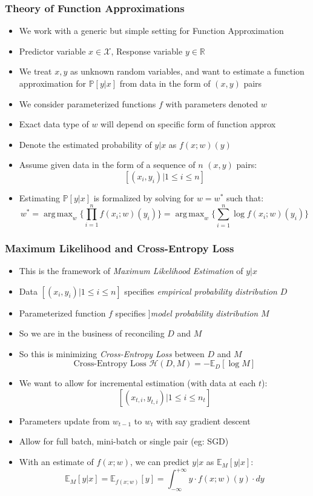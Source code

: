 \documentclass[handout]{beamer}
\DeclareMathOperator*{\argmax}{arg\,max}
\begin{document}
\begin{frame}
\frametitle{Theory of Function Approximations}
\pause
\begin{itemize}[<+->]
\item We work with a generic but simple setting for Function Approximation
\item Predictor variable $x \in \mathcal{X}$, Response variable $y \in \mathbb{R}$
\item We treat $x, y$ as unknown random variables, and want to estimate a function approximation for $\mathbb{P}[y|x]$ from data in the form of $(x,y)$ pairs
\item We consider parameterized functions $f$ with parameters denoted $w$
\item  Exact data type of $w$ will depend on specific form of function approx
\item  Denote the estimated probability of $y|x$ as $f(x; w)(y)$
\item  Assume given data in the form of a sequence of $n$ $(x,y)$ pairs:
$$[(x_i, y_i)|1 \leq i \leq n]$$
\item  Estimating $\mathbb{P}[y|x]$ is formalized by solving for $w=w^*$ such that:
$$w^* = \argmax_w \{ \prod_{i=1}^n f(x_i; w)(y_i)\} = \argmax_w \{ \sum_{i=1}^n \log f(x_i; w)(y_i)\}$$
\end{itemize}
\end{frame}

\begin{frame}
\frametitle{Maximum Likelihood and Cross-Entropy Loss}
\pause
\begin{itemize}[<+->]
\item This is the framework of {\em Maximum Likelihood Estimation} of $y|x$
\item Data $[(x_i, y_i)|1 \leq i \leq n]$ specifies {\em empirical probability distribution} $D$
\item Parameterized function $f$ specifies {]\em model probability distribution} $M$
\item So we are in the business of reconciling $D$ and $M$
\item So this is minimizing {\em Cross-Entropy Loss} between $D$ and $M$
$$ \text{Cross-Entropy Loss } \mathcal{H}(D, M) = -\mathbb{E}_D[\log M]$$
\item We want to allow for incremental estimation (with data at each $t$):
$$[(x_{t,i}, y_{t,i})|1 \leq i \leq n_t]$$
\item Parameters update from $w_{t-1}$ to $w_t$ with say gradient descent
\item Allow for full batch, mini-batch or single pair (eg: SGD)
\item With an estimate of $f(x;w)$, we can predict $y|x$ as $\mathbb{E}_M[y|x]$:
$$\mathbb{E}_M[y|x] = \mathbb{E}_{f(x;w)}[y] = \int_{-\infty}^{+\infty} y \cdot f(x;w)(y) \cdot dy$$
\end{itemize}
\end{frame}
\end{document}
